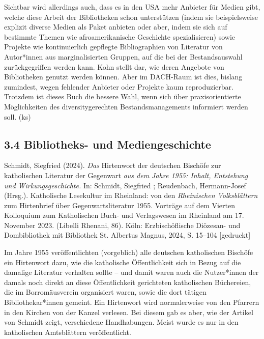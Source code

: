 \documentclass[a4paper,
fontsize=11pt,
oneside,
numbers=noperiodatend,
parskip=half-,
bibliography=totoc,
final
]{scrartcl}
\begin{document}
Sichtbar wird allerdings auch, dass es in den USA mehr Anbieter für
Medien gibt, welche diese Arbeit der Bibliotheken schon unterstützen
(indem sie beispielsweise explizit diverse Medien als Paket anbieten
oder aber, indem sie sich auf bestimmte Themen wie afroamerikanische
Geschichte spezialisieren) sowie Projekte wie kontinuierlich gepflegte
Bibliographien von Literatur von Autor*innen aus marginalisierten
Gruppen, auf die bei der Bestandsauswahl zurückgegriffen werden kann.
Kohn stellt dar, wie deren Angebote von Bibliotheken genutzt werden
können. Aber im DACH-Raum ist dies, bislang zumindest, wegen fehlender
Anbieter oder Projekte kaum reproduzierbar. Trotzdem ist dieses Buch die
bessere Wahl, wenn sich über praxisorientierte Möglichkeiten des
diversitygerechten Bestandsmanagements informiert werden soll. (ks)

\subsection{3.4 Bibliotheks- und
Mediengeschichte}\label{bibliotheks--und-mediengeschichte}

Schmidt, Siegfried (2024). \emph{Das} Hirtenwort der deutschen Bischöfe
zur katholischen Literatur der Gegenwart \emph{aus dem Jahre 1955:
Inhalt, Entstehung und Wirkungsgeschichte.} In: Schmidt, Siegfried ;
Reudenbach, Hermann-Josef (Hrsg.). Katholische Lesekultur im Rheinland:
von den \emph{Rheinischen Volksblättern} zum Hirtenbrief über
Gegenwartsliteratur 1955. Vorträge auf dem Vierten Kolloquium zum
Katholischen Buch- und Verlagswesen im Rheinland am 17. November 2023.
(Libelli Rhenani, 86). Köln: Erzbischöflische Diözesan- und
Dombibliothek mit Bibliothek St. Albertus Magnus, 2024, S. 15--104
{[}gedruckt{]}

Im Jahre 1955 veröffentlichten (vorgeblich) alle deutschen katholischen
Bischöfe ein Hirtenwort dazu, wie die katholische Öffentlichkeit sich in
Bezug auf die damalige Literatur verhalten sollte -- und damit waren
auch die Nutzer*innen der damals noch direkt an diese Öffentlichkeit
gerichteten katholischen Büchereien, die im Borromäusverein organisiert
waren, sowie die dort tätigen Bibliothekar*innen gemeint. Ein Hirtenwort
wird normalerweise von den Pfarrern in den Kirchen von der Kanzel
verlesen. Bei diesem gab es aber, wie der Artikel von Schmidt zeigt,
verschiedene Handhabungen. Meist wurde es nur in den katholischen
Amtsblättern veröffentlicht.
\end{document}
